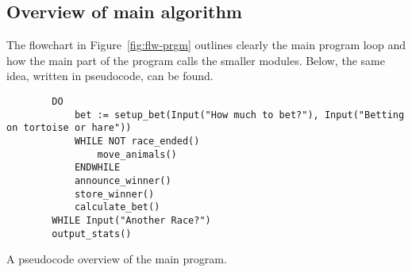 \documentclass[11pt]{article}
\begin{document}
    \subsection{Overview of main algorithm}
    The flowchart in Figure~\ref{fig:flw-prgm} outlines clearly the main program loop and how the main 
    part of the program calls the smaller modules. Below, the same idea, written in pseudocode, can be found.
    \begin{listing}
        \begin{verbatim}
        DO
            bet := setup_bet(Input("How much to bet?"), Input("Betting on tortoise or hare"))
            WHILE NOT race_ended()
                move_animals()
            ENDWHILE
            announce_winner()
            store_winner()
            calculate_bet()
        WHILE Input("Another Race?")
        output_stats()
        \end{verbatim}
        \caption{A pseudocode overview of the main program.}
        \label{lst:psd-overview}
    \end{listing}
\end{document}
